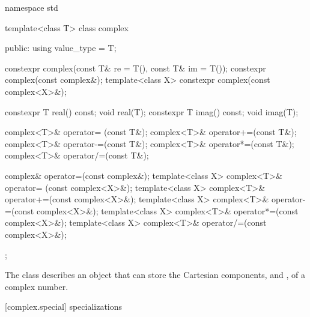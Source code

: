 %
\begin{codeblock}
namespace std {
  template<class T>
  class complex {
  public:
    using value_type = T;

    constexpr complex(const T& re = T(), const T& im = T());
    constexpr complex(const complex&);
    template<class X> constexpr complex(const complex<X>&);

    constexpr T real() const;
    void real(T);
    constexpr T imag() const;
    void imag(T);

    complex<T>& operator= (const T&);
    complex<T>& operator+=(const T&);
    complex<T>& operator-=(const T&);
    complex<T>& operator*=(const T&);
    complex<T>& operator/=(const T&);

    complex& operator=(const complex&);
    template<class X> complex<T>& operator= (const complex<X>&);
    template<class X> complex<T>& operator+=(const complex<X>&);
    template<class X> complex<T>& operator-=(const complex<X>&);
    template<class X> complex<T>& operator*=(const complex<X>&);
    template<class X> complex<T>& operator/=(const complex<X>&);
  };
}
\end{codeblock}

\pnum
The class
describes an object that can
store the Cartesian components,
and
,
of a complex
number.

[complex.special]{ specializations}

